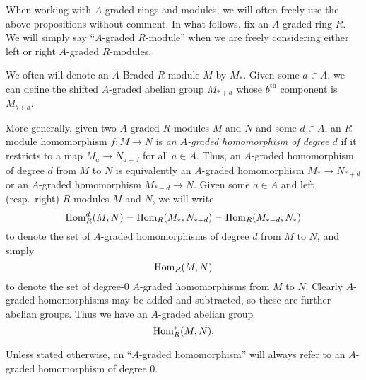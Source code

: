 \documentclass[../main.tex]{subfiles}
\begin{document}
When working with $A$-graded rings and modules, we will often freely use the above propositions without comment. In what follows, fix an $A$-graded ring $R$. We will simply say ``$A$-graded $R$-module'' when we are freely considering either left or right $A$-graded $R$-modules.

\begin{remark}
	We often will denote an $A$-Braded $R$-module $M$ by $M_*$. Given some $a\in A$, we can define the shifted $A$-graded abelian group $M_{*+a}$ whose $b^\text{th}$ component is $M_{b+a}$.
\end{remark}

\begin{definition}
    More generally, given two $A$-graded $R$-modules $M$ and $N$ and some $d\in A$, an $R$-module homomorphism $f:M\to N$ is \emph{an $A$-graded homomorphism of degree $d$} if it restricts to a map $M_a\to N_{a+d}$ for all $a\in A$. Thus, an $A$-graded homomorphism of degree $d$ from $M$ to $N$ is equivalently an $A$-graded homomorphism $M_*\to N_{*+d}$ or an $A$-graded homomorphism $M_{*-d}\to N$. Given some $a\in A$ and left (resp.\ right) $R$-modules $M$ and $N$, we will write 
	\[\mathrm{Hom}_R^d(M,N)=\mathrm{Hom}_R(M_*,N_{*+d})=\mathrm{Hom}_R(M_{*-d},N_*)\]
	to denote the set of $A$-graded homomorphisms of degree $d$ from $M$ to $N$, and simply
	\[\mathrm{Hom}_R(M,N)\] 
	to denote the set of degree-$0$ $A$-graded homomorphisms from $M$ to $N$. Clearly $A$-graded homomorphisms may be added and subtracted, so these are further abelian groups. Thus we have an $A$-graded abelian group
	\[\mathrm{Hom}_R^*(M,N).\]
\end{definition}

Unless stated otherwise, an ``$A$-graded homomorphism'' will always refer to an $A$-graded homomorphism of degree $0$. 
\end{document}
